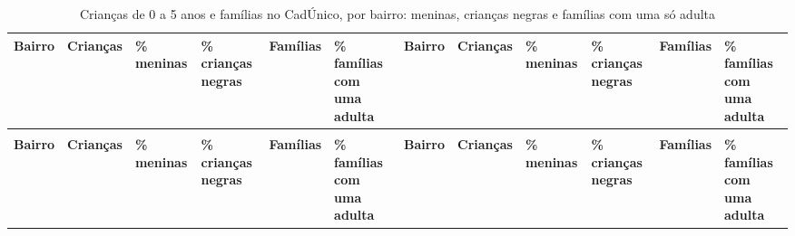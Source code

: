 \begin{apendicesenv}
\begin{landscape}
{\renewcommand{\arraystretch}{1.0}
{\scriptsize\setlength{\tabcolsep}{3.5pt}
\begin{longtable}{@{}>{\raggedright\arraybackslash}p{2.65cm}>{\raggedleft\arraybackslash}p{1.56cm}>{\raggedleft\arraybackslash}p{1.56cm}>{\raggedleft\arraybackslash}p{1.56cm}>{\raggedleft\arraybackslash}p{1.56cm}>{\raggedleft\arraybackslash}p{1.56cm}@{\hspace{0.6cm}}>{\raggedright\arraybackslash}p{2.65cm}>{\raggedleft\arraybackslash}p{1.56cm}>{\raggedleft\arraybackslash}p{1.56cm}>{\raggedleft\arraybackslash}p{1.56cm}>{\raggedleft\arraybackslash}p{1.56cm}>{\raggedleft\arraybackslash}p{1.56cm}@{}}
\caption{Crianças de 0 a 5 anos e famílias no CadÚnico, por bairro: meninas, crianças negras e famílias com uma só adulta}\label{tab:tabela-mapa-cadunico-recortes-bairro-2026}\\
\toprule \hyphenpenalty=10000\exhyphenpenalty=10000\textbf{Bairro} & \hyphenpenalty=10000\exhyphenpenalty=10000\textbf{Crianças} & \hyphenpenalty=10000\exhyphenpenalty=10000\textbf{\% meninas} & \hyphenpenalty=10000\exhyphenpenalty=10000\textbf{\% crianças negras} & \hyphenpenalty=10000\exhyphenpenalty=10000\textbf{Famílias} & \hyphenpenalty=10000\exhyphenpenalty=10000\textbf{\% famílias com uma adulta} & \hyphenpenalty=10000\exhyphenpenalty=10000\textbf{Bairro} & \hyphenpenalty=10000\exhyphenpenalty=10000\textbf{Crianças} & \hyphenpenalty=10000\exhyphenpenalty=10000\textbf{\% meninas} & \hyphenpenalty=10000\exhyphenpenalty=10000\textbf{\% crianças negras} & \hyphenpenalty=10000\exhyphenpenalty=10000\textbf{Famílias} & \hyphenpenalty=10000\exhyphenpenalty=10000\textbf{\% famílias com uma adulta} \\ \midrule \endfirsthead
\multicolumn{12}{@{}l}{\footnotesize\itshape (continuação)}\\ \toprule \hyphenpenalty=10000\exhyphenpenalty=10000\textbf{Bairro} & \hyphenpenalty=10000\exhyphenpenalty=10000\textbf{Crianças} & \hyphenpenalty=10000\exhyphenpenalty=10000\textbf{\% meninas} & \hyphenpenalty=10000\exhyphenpenalty=10000\textbf{\% crianças negras} & \hyphenpenalty=10000\exhyphenpenalty=10000\textbf{Famílias} & \hyphenpenalty=10000\exhyphenpenalty=10000\textbf{\% famílias com uma adulta} & \hyphenpenalty=10000\exhyphenpenalty=10000\textbf{Bairro} & \hyphenpenalty=10000\exhyphenpenalty=10000\textbf{Crianças} & \hyphenpenalty=10000\exhyphenpenalty=10000\textbf{\% meninas} & \hyphenpenalty=10000\exhyphenpenalty=10000\textbf{\% crianças negras} & \hyphenpenalty=10000\exhyphenpenalty=10000\textbf{Famílias} & \hyphenpenalty=10000\exhyphenpenalty=10000\textbf{\% famílias com uma adulta} \\ \midrule \endhead

\end{longtable}}}
\end{landscape}
\end{apendicesenv}

